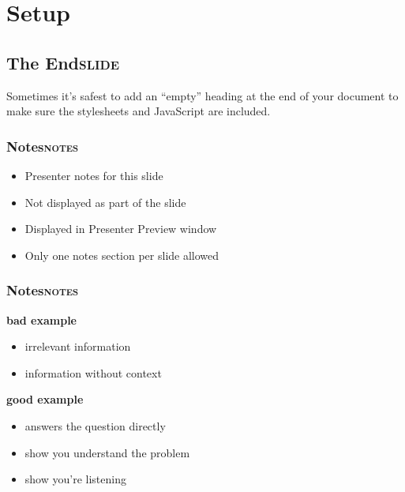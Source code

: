 \documentclass[11pt]{article}
\begin{document}
\section{Setup}
\label{sec:orga538e68}


\subsection{The End\hfill{}\textsc{slide}}
\label{sec:orgf691274}

Sometimes it's safest to add an ``empty'' heading at the end of your document to make sure the stylesheets and JavaScript are included.


\subsubsection{Notes\hfill{}\textsc{notes}}
\label{sec:orgc4dadd4}

\begin{itemize}
\item Presenter notes for this slide
\item Not displayed as part of the slide
\item Displayed in Presenter Preview window
\item Only one notes section per slide allowed
\end{itemize}

\subsubsection{Notes\hfill{}\textsc{notes}}
\label{sec:orgd1af23d}

\textbf{bad example}
\begin{itemize}
\item irrelevant information
\item information without context
\end{itemize}

\textbf{good example}
\begin{itemize}
\item answers the question directly
\item show you understand the problem
\item show you're listening
\end{itemize}
\end{document}

